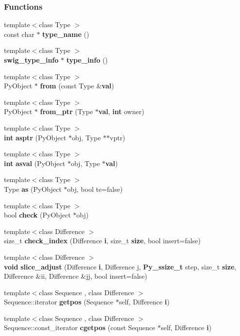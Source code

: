 \subsubsection*{Functions}
\begin{DoxyCompactItemize}
\item 
{\footnotesize template$<$class Type $>$ }\\const char $\ast$ {\bf type\+\_\+name} ()
\item 
{\footnotesize template$<$class Type $>$ }\\{\bf swig\+\_\+type\+\_\+info} $\ast$ {\bf type\+\_\+info} ()
\item 
{\footnotesize template$<$class Type $>$ }\\Py\+Object $\ast$ {\bf from} (const Type \&{\bf val})
\item 
{\footnotesize template$<$class Type $>$ }\\Py\+Object $\ast$ {\bf from\+\_\+ptr} (Type $\ast${\bf val}, {\bf int} owner)
\item 
{\footnotesize template$<$class Type $>$ }\\{\bf int} {\bf asptr} (Py\+Object $\ast$obj, Type $\ast$$\ast$vptr)
\item 
{\footnotesize template$<$class Type $>$ }\\{\bf int} {\bf asval} (Py\+Object $\ast$obj, Type $\ast${\bf val})
\item 
{\footnotesize template$<$class Type $>$ }\\Type {\bf as} (Py\+Object $\ast$obj, bool te=false)
\item 
{\footnotesize template$<$class Type $>$ }\\bool {\bf check} (Py\+Object $\ast$obj)
\item 
{\footnotesize template$<$class Difference $>$ }\\size\+\_\+t {\bf check\+\_\+index} (Difference {\bf i}, size\+\_\+t {\bf size}, bool insert=false)
\item 
{\footnotesize template$<$class Difference $>$ }\\{\bf void} {\bf slice\+\_\+adjust} (Difference {\bf i}, Difference j, {\bf Py\+\_\+ssize\+\_\+t} step, size\+\_\+t {\bf size}, Difference \&ii, Difference \&jj, bool insert=false)
\item 
{\footnotesize template$<$class Sequence , class Difference $>$ }\\Sequence\+::iterator {\bf getpos} (Sequence $\ast$self, Difference {\bf i})
\item 
{\footnotesize template$<$class Sequence , class Difference $>$ }\\Sequence\+::const\+\_\+iterator {\bf cgetpos} (const Sequence $\ast$self, Difference {\bf i})
$$
\end{DoxyCompactItemize}
